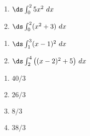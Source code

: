 {\noindent
\begin{minipage}{\linewidth}
\end{minipage}
\noindent\begin{minipage}[t]{.5\linewidth}
\begin{enumerate}
\item		$\ds \int_{0}^{2} 5x^2\ dx$
\item		$\ds \int_0^2 (x^2+3)\ dx$
\end{enumerate}
\end{minipage}
\begin{minipage}[t]{.5\linewidth}
\begin{enumerate}\addtocounter{enumii}{2}
\item		$\ds \int_{1}^3 (x-1)^2\ dx$
\item		$\ds \int_2^4 \big((x-2)^2+5\big)\ dx$
\end{enumerate}
\end{minipage}
}
{\begin{enumerate}
\item		$40/3$
\item		$26/3$
\item		$8/3$
\item		$38/3$
\end{enumerate}
}

